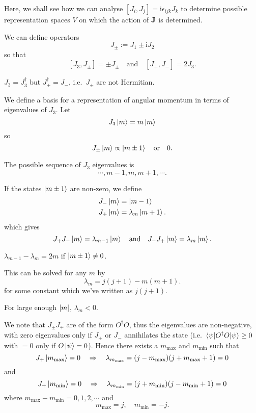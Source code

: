 \documentclass[a4paper,11pt]{article}
\begin{document}
	Here, we shall see how we can analyse $[J_i , J_j] = \mathrm{i} \epsilon _{ijk} J_k$ to determine possible representation spaces $V$ on which the action of $\vb J$ is determined.
	
	We can define operators
	\[
		J _{\pm} := J_1 \pm \mathrm{i} J_2
	\]
	so that
	\[
		[J_3,J_\pm] = \pm J_\pm \quad \text{and} \quad [J_+, J_-] = 2J_3.
	\]
	\begin{nt}
		$J_3 = J_3^\dagger$ but $J_+^\dagger = J_-$, i.e.\ $J_\pm$ are not Hermitian.
	\end{nt}
	 
	We define a basis for a representation of angular momentum in terms of eigenvalues of $J_3$. Let 
	\[
		J_3 \ket{m} = m \ket{m}
	\]
	so
	\[
		J_\pm \ket{m} \propto \ket{m\pm 1} \quad \text{or}\quad 0.
	\]
	
	The possible sequence of $J_3$ eigenvalues is
	\[
		\cdots, m-1, m, m+1, \cdots.
	\]
	
	If the states $\ket{m\pm 1}$ are non-zero, we define
	\begin{align*}
		J_- \ket{m} & = \ket{m-1}\\
		J_+ \ket{m} & = \lambda_m \ket{m+1}.
	\end{align*}
	which gives
	\[
		J_+ J_- \ket{m} = \lambda _{m-1} \ket{m} \quad \text{and} \quad J_- J_+ \ket{m} = \lambda_m \ket{m}.
	\]
	
	$\lambda _{m-1} - \lambda_m = 2m$ if $\ket{m \pm 1} \neq 0$.

	This can be solved for any $m$ by 
	\begin{equation}
		\lambda_m = j(j+1) - m(m+1).
		\label{eq:3.4.1}
	\end{equation}
	for some constant which we've written as $j(j+1)$.

	For large enough $\abs{m}$, $\lambda_m < 0$.

	We note that  $J _{\pm}J _{\mp}$ are of the form $O^\dagger O$, thus the eigenvalues are non-negative, with zero eigenvalues only if $J_+$ or $J_-$ annihilates the state (i.e. $\mel{\psi}{O^\dagger O}{\psi} \geq 0$ with $=0$ only if $O \ket{\psi}=0$). Hence there exists a $m _{\text{max}}$ and $m _{\text{min}}$ such that
	\[
		J_+ \ket{m _{\text{max}}} = 0 \quad \Rightarrow \quad \lambda _{m _{\text{max}}} = (j - m _{\text{max}})(j + m _{\text{max}} + 1) = 0
	\]
	and
	\[
		J_+ \ket{m _{\text{min}}} = 0 \quad \Rightarrow \quad \lambda _{m _{\text{min}}} = (j + m _{\text{min}})(j - m _{\text{min}} + 1) = 0
	\]
	where $m _{\text{max}} - m _{\text{min}} = 0, 1, 2, \cdots$ and 
	\[
		m _{\text{max}} = j, \quad m _{\text{min}} = - j.
	\]
	
\end{document}
